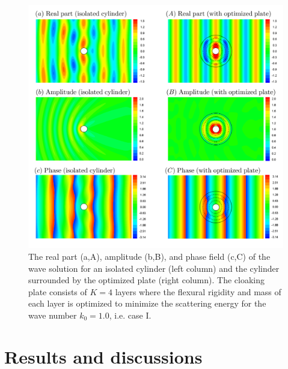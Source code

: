 \documentclass{jfm}
\begin{document}
\begin{figure}
 \includegraphics[width=5.0in]{./fig/fig2.png}
 \caption{The real part (a,A), amplitude (b,B), and phase field (c,C) of the wave solution for an isolated cylinder (left column) and the cylinder surrounded by the optimized plate (right column). The cloaking plate consists of $K=4$ layers where the flexural rigidity and mass  of each layer is optimized  to minimize the scattering energy for the wave number $k_0=1.0$, i.e. case I.  }
 \label{fig2}
\end{figure}






\section{Results and discussions}
\end{document}
